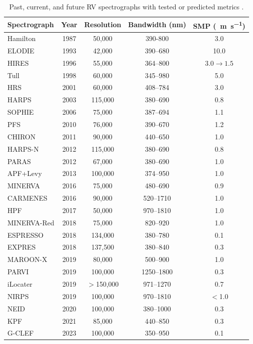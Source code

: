 \begin{table}
    \centering
    \small
    \begin{tabular}{lcccc}
        \hline
        \hline
        Spectrograph & Year & Resolution & Bandwidth (nm) & SMP (~\si{\meter\per\second}) \\
        \hline
        Hamilton & 1987 & 50,000 & 390-800 & 3.0 \\
        ELODIE & 1993 & 42,000 & 390--680 & 10.0 \\
        HIRES & 1996 & 55,000 & 364--800 & $3.0\rightarrow1.5$ \\
        Tull & 1998 & 60,000 & 345--980 & 5.0 \\
        HRS & 2001 & 60,000 & 408--784 & 3.0 \\
        \hline
        HARPS & 2003 & 115,000 & 380--690 & 0.8 \\
        SOPHIE & 2006 & 75,000 & 387--694 & 1.1 \\
        PFS & 2010 & 76,000 & 390--670 & 1.2 \\
        CHIRON & 2011 & 90,000 & 440--650 & 1.0 \\
        HARPS-N & 2012 & 115,000 & 380--690 & 0.8 \\
        PARAS & 2012 & 67,000 & 380--690 & 1.0 \\
        APF+Levy & 2013 & 100,000 & 374--950 & 1.0 \\
        \hline
        MINERVA & 2016 & 75,000 & 480--690 & 0.9 \\
        CARMENES & 2016 & 90,000 & 520--1710 & 1.0 \\
        HPF & 2017 & 50,000 & 970--1810 & 1.0 \\
        MINERVA-Red & 2018 & 75,000 & 820--920 & 1.0 \\
        ESPRESSO & 2018 & 134,000 & 380--780 & 0.1 \\
        EXPRES & 2018 & 137,500 & 380--840 & 0.3 \\
        MAROON-X & 2019 & 80,000 & 500--900 & 1.0 \\
        PARVI & 2019 & 100,000 & 1250--1800 & 0.3 \\
        iLocater & 2019 & $>$150,000 & 971--1270 & 0.7 \\
        NIRPS & 2019 & 100,000 & 970--1810 & $<$1.0 \\
        NEID & 2020 & 100,000 & 380--1000 & 0.3 \\
        KPF & 2021 & 85,000 & 440--850 & 0.3 \\
        G-CLEF & 2023 & 100,000 & 350--950 & 0.1 \\
        \hline
    \end{tabular}
    \caption[History of radial-velocity spectrographs]{Past, current, and future RV spectrographs with tested or predicted metrics \citep{fischer_state_2016, wright_third_2017}.}
    \label{tab:spectrographs}
\end{table}

